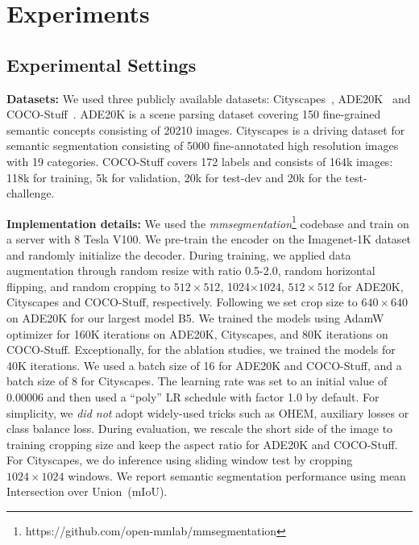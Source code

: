 \section{Experiments} \label{sec:exp}
\subsection{Experimental Settings}
\textbf{Datasets:} We used three publicly available datasets: Cityscapes~\cite{cityscape}, ADE20K~\cite{ade20k} and COCO-Stuff~\cite{cocostuff}. ADE20K is a scene parsing dataset covering 150 fine-grained semantic concepts consisting of 20210 images. Cityscapes is a driving dataset for semantic segmentation consisting of 5000 fine-annotated high resolution images with 19 categories. COCO-Stuff covers 172 labels and consists of 164k images: 118k for training, 5k for validation, 20k for test-dev and 20k for the test-challenge.

\textbf{Implementation details:} We used the \textit{mmsegmentation}\footnote{https://github.com/open-mmlab/mmsegmentation} codebase and train on a server with 8 Tesla V100. We pre-train the encoder on the Imagenet-1K dataset and randomly initialize the decoder. During training, we applied data augmentation through random resize with ratio 0.5-2.0, random horizontal flipping, and random cropping to $512 \times 512$, 1024$ \times 1024$, $512 \times 512$ for ADE20K, Cityscapes and COCO-Stuff, respectively. Following \cite{liu2021swin} we set crop size to $640 \times 640$ on ADE20K for our largest model B5. We trained the models using AdamW optimizer for 160K iterations on ADE20K, Cityscapes, and 80K iterations on COCO-Stuff. Exceptionally, for the ablation studies, we trained the models for 40K iterations. We used a batch size of 16 for ADE20K and COCO-Stuff, and a batch size of 8 for Cityscapes. The learning rate was set to an initial value of 0.00006 and then used a ``poly'' LR schedule with factor 1.0 by default. For simplicity, we \textit{did not} adopt widely-used tricks such as OHEM, auxiliary losses or class balance loss. During evaluation, we rescale the short side of the image to training cropping size and keep the aspect ratio for ADE20K and COCO-Stuff. For Cityscapes, we do inference using sliding window test by cropping $1024 \times 1024$ windows. We report semantic segmentation performance using mean Intersection over Union~(mIoU).

